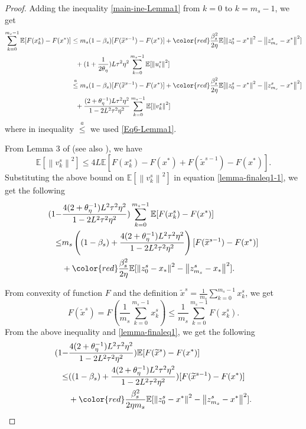 \documentclass[10pt, conference, compsocconf]{IEEEtran}
\newcommand*{\E}{\mathbb{E}}
\newcommand{\norm}[1]{\left\lVert#1\right\rVert}
\theoremstyle{definition}
\theoremstyle{remark}
\begin{document}
\begin{proof}
Adding the inequality \eqref{main-ine-Lemma1} from $k=0$ to $k=m_s-1$, we get
\begin{equation}\label{lemma-finaleq1-1}
\begin{split}
\sum_{k=0}^{m_s-1}\E[F(x_k^s)-F(x^*)] &\leq m_s(1-\beta_s)[F(\widetilde{x}^{s-1})-F(x^*)] + {\color{red}\frac{ \beta_s^2}{2\eta}}\E[\norm{z_{0}^s-x^*}^2-\norm{z_{m_s}^s-x^*}^2]\\
&~~+(1+\frac{1}{2\theta_{\eta}})L\tau^2\eta^2\sum_{k=0}^{m_s-1}\E[\norm{u_{i}^s}^2]\\
&\stackrel{a}{\leq} m_s(1-\beta_s)[F(\widetilde{x}^{s-1})-F(x^*)] + {\color{red}\frac{ \beta_s^2}{2\eta}}\E[\norm{z_{0}^s-x^*}^2-\norm{z_{m_s}^s-x^*}^2]\\
&~~+\frac{(2+\theta_{\eta}^{-1})L\tau^2\eta^2}{1-2L^2 \tau^2\eta^2}\sum_{k=0}^{m_s-1}\E[\norm{v^s_k}^2]
\end{split}
\end{equation}
where in inequality $\stackrel{a}{\leq}$ we used \eqref{Eq6-Lemma1}.


From Lemma 3 of \cite{Johnson12} (see also \cite{Reddi2015}), we have 
\[
\E[\norm{v^s_k}^2] \leq 4L \E[F(x_k^s)-F(x^*)+F(\widetilde{x}^{s-1})-F(x^*)].
\]
Substituting the above bound on $\E[\norm{v^s_k}^2]$ in equation \eqref{lemma-finaleq1-1}, we get the following
\begin{equation}\label{lemma-finaleq1}
\begin{split}
(1-&\frac{4(2+\theta_{\eta}^{-1})L^2\tau^2\eta^2}{1-2L^2 \tau^2\eta^2})\sum_{k=0}^{m_s-1}\E[F(x_k^s)-F(x^*)]\\ 
\leq &m_s\left((1-\beta_s)+\frac{4(2+\theta_{\eta}^{-1})L^2\tau^2\eta^2}{1-2L^2 \tau^2\eta^2}\right)[F(\widetilde{x}^{s-1})-F(x^*)] \\
&+ {\color{red}\frac{ \beta_s^2}{2\eta}}\E[\norm{z_{0}^s-x_*}^2-\norm{z_{m_s}^s-x_*}^2].
\end{split}
\end{equation}

From convexity of function $F$ and the definition $\widetilde{x}^s = \frac{1}{m_s}\sum_{k=0}^{m_s-1}x_k^s$, we get 
\[
F(\widetilde{x}^s) = F(\frac{1}{m_s}\sum_{k=0}^{m_s-1} x_k^s)\leq \frac{1}{m_s}\sum_{k=0}^{m_s-1}F(x_k^s).
\]
From the above inequality and \eqref{lemma-finaleq1}, we get the following
\begin{equation}
\begin{split}
(1-&\frac{4(2+\theta_{\eta}^{-1})L^2\tau^2\eta^2}{1-2L^2 \tau^2\eta^2})\E[F(\widetilde{x}^s)-F(x^*)]\\ 
\leq &((1-\beta_s)+\frac{4(2+\theta_{\eta}^{-1})L^2\tau^2\eta^2}{1-2L^2 \tau^2\eta^2})[F(\widetilde{x}^{s-1})-F(x^*)] \\
&+ {\color{red}\frac{\beta_s^2}{2\eta m_s}}\E[\norm{z_{0}^s-x^*}^2-\norm{z_{m_s}^s-x^*}^2].
\end{split}
\end{equation}
\end{proof}
\end{document}
